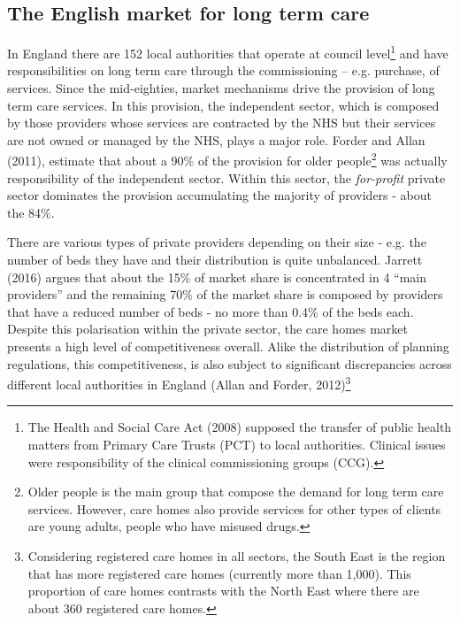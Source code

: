 \documentclass[12pt,letterpaper]{article}
\begin{document}
\subsection{The English market for long term care}
\label{sec: long }

In England there are 152 local authorities that operate at council level\footnote{The Health and Social Care Act (2008) 
supposed the transfer of public health matters from Primary Care Trusts (PCT) 
to local authorities. Clinical issues were responsibility of the clinical commissioning groups (CCG).} and have 
responsibilities on long term care through the commissioning – e.g. purchase, of services.
 Since the mid-eighties, market mechanisms drive the provision of long term care services. 
 In this provision, the independent sector, which is composed by those providers whose services 
 are contracted by the NHS but their services are not owned or managed by the NHS, plays a major role. 
 Forder and Allan (2011), estimate that about a 90\% of the provision for older 
 people\footnote{Older people is the main group that compose the demand for long term care services. 
 However, care homes also provide services for other types of clients are young adults, people who have misused
 drugs.} was actually responsibility of the independent sector. Within this sector, the {\it for-profit} private 
 sector dominates the provision accumulating the majority of providers - about the 84\%.  
 
 There are various types of private providers depending on their size - e.g. the number of beds they have
  and their distribution is quite unbalanced. Jarrett (2016) argues that about the 15\% of market share is 
  concentrated in 4 “main providers” and the remaining 70\% of the market share is composed by providers 
  that have a reduced number of beds - no more than 0.4\% of the beds each. Despite this polarisation 
  within the private sector, the care homes market presents a high level of competitiveness overall. Alike
   the distribution of planning regulations, this competitiveness, is also subject to significant discrepancies 
   across different local authorities in England (Allan and Forder, 
   2012)\footnote{Considering registered care homes in all sectors, the South East is the region that has more registered care homes (currently more than 1,000). This proportion of care homes contrasts with the North East where there are about 360 registered care homes.}
 
\end{document}
